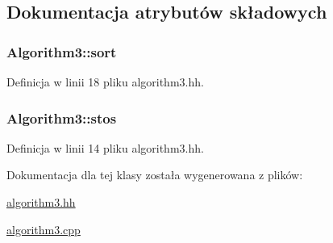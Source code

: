 \subsection{Dokumentacja atrybutów składowych}
\hypertarget{class_algorithm3_a536a59931cc4e26ffb0eac855c76ff8a}{
\subsubsection[{sort}]{ Algorithm3\-::sort\hspace{0.3cm}{\ttfamily [private]}}}\label{class_algorithm3_a536a59931cc4e26ffb0eac855c76ff8a}


Definicja w linii 18 pliku algorithm3.\-hh.

\hypertarget{class_algorithm3_afbbe5f5bd47a6af1a83065319ad5d36a}{
\subsubsection[{stos}]{ Algorithm3\-::stos\hspace{0.3cm}{\ttfamily [private]}}}\label{class_algorithm3_afbbe5f5bd47a6af1a83065319ad5d36a}


Definicja w linii 14 pliku algorithm3.\-hh.



Dokumentacja dla tej klasy została wygenerowana z plików\-:\begin{DoxyCompactItemize}
\item 
\hyperlink{algorithm3_8hh}{algorithm3.\-hh}\item 
\hyperlink{algorithm3_8cpp}{algorithm3.\-cpp}\end{DoxyCompactItemize}
